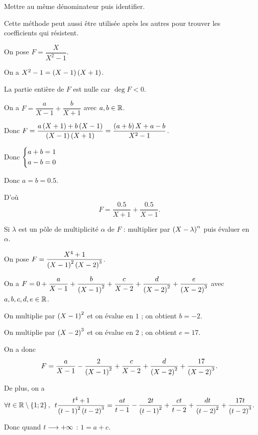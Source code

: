 \begin{meth}
Mettre au même dénominateur puis identifier.

Cette méthode peut aussi être utilisée après les autres pour trouver les coefficients qui résistent.
\end{meth}

\begin{ex}
On pose \(F=\dfrac{X}{X^2-1}\).

On a \(X^2-1=\left(X-1\right)\left(X+1\right)\).

La partie entière de \(F\) est nulle car \(\deg F<0\).

On a \(F=\dfrac{a}{X-1}+\dfrac{b}{X+1}\) avec \(a,b\in\mathbb{R}\).

Donc \(F=\dfrac{a\left(X+1\right)+b\left(X-1\right)}{\left(X-1\right)\left(X+1\right)}=\dfrac{\left(a+b\right)X+a-b}{X^2-1}\).

Donc \(\begin{dcases}a+b=1 \\ a-b=0\end{dcases}\)

Donc \(a=b=\num{0.5}\).

D'où \[F=\dfrac{\num{0.5}}{X+1}+\dfrac{\num{0.5}}{X-1}.\]
\end{ex}

\begin{meth}[Classique]
Si \(\lambda\) est un pôle de multiplicité \(\alpha\) de \(F\) : multiplier par \(\left(X-\lambda\right)^{\alpha}\) puis évaluer en \(\alpha\).
\end{meth}

\begin{ex}
On pose \(F=\dfrac{X^4+1}{\left(X-1\right)^2\left(X-2\right)^3}\).

On a \(F=0+\dfrac{a}{X-1}+\dfrac{b}{\left(X-1\right)^2}+\dfrac{c}{X-2}+\dfrac{d}{\left(X-2\right)^2}+\dfrac{e}{\left(X-2\right)^3}\) avec \(a,b,c,d,e\in\mathbb{R}\).

On multiplie par \(\left(X-1\right)^2\) et on évalue en \(1\) ; on obtient \(b=-2\).

On multiplie par \(\left(X-2\right)^3\) et on évalue en \(2\) ; on obtient \(e=17\).

On a donc \[F=\dfrac{a}{X-1}-\dfrac{2}{\left(X-1\right)^2}+\dfrac{c}{X-2}+\dfrac{d}{\left(X-2\right)^2}+\dfrac{17}{\left(X-2\right)^3}.\]

De plus, on a \[\quantifs{\forall t\in\R\excluant\accol{1;2}}t\dfrac{t^4+1}{\paren{t-1}^2\paren{t-2}^3}=\dfrac{at}{t-1}-\dfrac{2t}{\paren{t-1}^2}+\dfrac{ct}{t-2}+\dfrac{dt}{\paren{t-2}^2}+\dfrac{17t}{\paren{t-2}^3}.\]

Donc quand \(t\longrightarrow+\infty\) : \(1=a+c\).

\end{ex}

